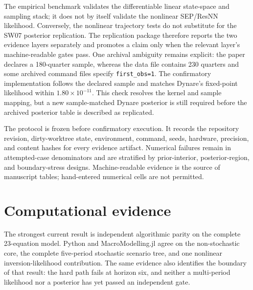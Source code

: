 \documentclass[11pt]{article}
\begin{document}
The empirical benchmark validates the differentiable linear state-space and
sampling stack; it does not by itself validate the nonlinear SEP/ResNN
likelihood. Conversely, the nonlinear trajectory tests do not substitute for
the SW07 posterior replication. The replication package therefore reports the
two evidence layers separately and promotes a claim only when the relevant
layer's machine-readable gates pass. One archival ambiguity remains explicit:
the paper declares a 180-quarter sample, whereas the data file contains 230
quarters and some archived command files specify \texttt{first\_obs=1}. The
confirmatory implementation follows the declared sample and matches Dynare's
fixed-point likelihood within $1.80\times10^{-11}$. This check resolves the
kernel and sample mapping, but a new sample-matched Dynare posterior is still
required before the archived posterior table is described as replicated.

The protocol is frozen before confirmatory execution. It records the repository
revision, dirty-worktree state, environment, command, seeds, hardware, precision,
and content hashes for every evidence artifact. Numerical failures remain in
attempted-case denominators and are stratified by prior-interior,
posterior-region, and boundary-stress designs. Machine-readable evidence is the
source of manuscript tables; hand-entered numerical cells are not permitted.

\section{Computational evidence}

The strongest current result is independent algorithmic parity on the complete
23-equation model. Python and MacroModelling.jl agree on the non-stochastic
core, the complete five-period stochastic scenario tree, and one nonlinear
inversion-likelihood contribution. The same evidence also identifies the
boundary of that result: the hard path fails at horizon six, and neither a
multi-period likelihood nor a posterior has yet passed an independent gate.










\end{document}
